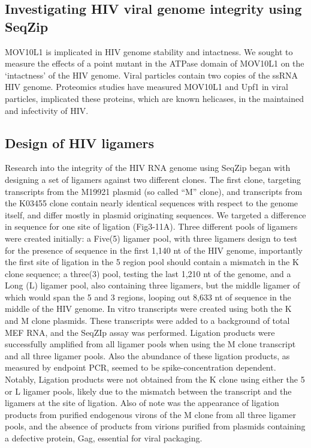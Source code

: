   \subsection{Investigating HIV viral genome integrity using SeqZip}\label{subsec: HIV}


  	MOV10L1 is implicated in HIV genome stability and intactness. We sought to measure the effects of a point mutant in the ATPase domain of MOV10L1 on the ‘intactness’ of the HIV genome. Viral particles contain two copies of the ssRNA HIV genome. Proteomics studies have measured MOV10L1 and Upf1 in viral particles, implicated these proteins, which are known helicases, in the maintained and infectivity of HIV.

	\subsection{Design of HIV ligamers}

	  Research into the integrity of the HIV RNA genome using SeqZip began with designing a set of ligamers against two different clones. The first clone, targeting transcripts from the M19921 plasmid (so called ``M'' clone), and transcripts from the K03455 clone contain nearly identical sequences with respect to the genome itself, and differ mostly in plasmid originating sequences. We targeted a difference in sequence for one site of ligation (Fig3-11A). Three different pools of ligamers were created initially: a Five(5) ligamer pool, with three ligamers design to test for the presence of sequence in the first 1,140 nt of the HIV genome, importantly the first site of ligation in the 5 region pool should contain a mismatch in the K clone sequence; a three(3) pool, testing the last 1,210 nt of the genome, and a Long (L) ligamer pool, also containing three ligamers, but the middle ligamer of which would span the 5 and 3 regions, looping out 8,633 nt of sequence in the middle of the HIV genome. In vitro transcripts were created using both the K and M clone plasmids. These transcripts were added to a background of total MEF RNA, and the SeqZIp assay was performed. Ligation products were successfully amplified from all ligamer pools when using the M clone transcript and all three ligamer pools. Also the abundance of these ligation products, as measured by endpoint PCR, seemed to be spike-concentration dependent. Notably, Ligation products were not obtained from the K clone using either the 5 or L ligamer pools, likely due to the mismatch between the transcript and the ligamers at the site of ligation. Also of note was the appearance of ligation products from purified endogenous virons of the M clone from all three ligamer pools, and the absence of products from virions purified from plasmids containing a defective protein, Gag, essential for viral packaging. 

